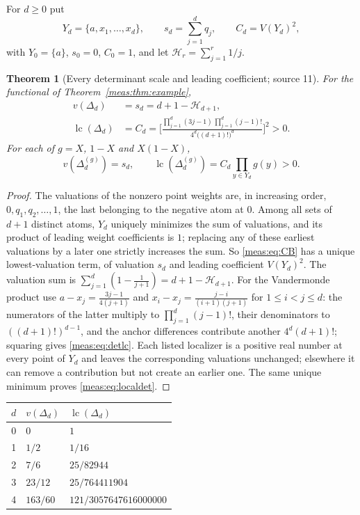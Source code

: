 \documentclass[11pt]{article}
\numberwithin{equation}{section}
\newtheorem{theorem}{Theorem}[section]
\theoremstyle{definition}
\theoremstyle{remark}
\newcommand{\lc}{\operatorname{lc}}
\begin{document}
For $d\ge0$ put
\[
 Y_d=\{a,x_1,\ldots,x_d\},\qquad s_d=\sum_{j=1}^dq_j,\qquad C_d=V(Y_d)^2,
\]
with $Y_0=\{a\}$, $s_0=0$, $C_0=1$, and let $\mathcal H_r=\sum_{j=1}^r1/j$.

\begin{theorem}[Every determinant scale and leading coefficient; source 11]
\label{meas:thm:determinants}
For the functional of Theorem~\ref{meas:thm:example},
\begin{align}
 v(\Delta_d)&=s_d=d+1-\mathcal H_{d+1},\label{meas:eq:detval}\\
 \lc(\Delta_d)&=C_d=\Biggl[
 \frac{\prod_{j=1}^{d}(3j-1)\,\prod_{j=1}^{d}(j-1)!}{4^d\bigl((d+1)!\bigr)^d}
 \Biggr]^2>0.\label{meas:eq:detlc}
\end{align}
For each of $g=X$, $1-X$ and $X(1-X)$,
\begin{equation}\label{meas:eq:localdet}
 v(\Delta_d^{(g)})=s_d,\qquad \lc(\Delta_d^{(g)})=C_d\prod_{y\in Y_d}g(y)>0.
\end{equation}
\end{theorem}
\begin{proof}
The valuations of the nonzero point weights are, in increasing order,
$0,q_1,q_2,\ldots,1$, the last belonging to the negative atom at $0$. Among all
sets of $d+1$ distinct atoms, $Y_d$ uniquely minimizes the sum of valuations,
and its product of leading weight coefficients is $1$; replacing any of these
earliest valuations by a later one strictly increases the sum. So
\eqref{meas:eq:CB} has a unique lowest-valuation term, of valuation $s_d$ and
leading coefficient $V(Y_d)^2$. The valuation sum is
$\sum_{j=1}^d(1-\frac1{j+1})=d+1-\mathcal H_{d+1}$. For the Vandermonde product
use $a-x_j=\frac{3j-1}{4(j+1)}$ and $x_i-x_j=\frac{j-i}{(i+1)(j+1)}$ for
$1\le i<j\le d$: the numerators of the latter multiply to
$\prod_{j=1}^d(j-1)!$, their denominators to $((d+1)!)^{d-1}$, and the anchor
differences contribute another $4^d(d+1)!$; squaring gives
\eqref{meas:eq:detlc}. Each listed localizer is a positive real number at every
point of $Y_d$ and leaves the corresponding valuations unchanged; elsewhere it
can remove a contribution but not create an earlier one. The same unique
minimum proves \eqref{meas:eq:localdet}.
\end{proof}

\begin{center}
\small
\begin{tabular}{@{}rll@{}}
\toprule
$d$ & $v(\Delta_d)$ & $\lc(\Delta_d)$\\
\midrule
0 & $0$ & $1$\\
1 & $1/2$ & $1/16$\\
2 & $7/6$ & $25/82944$\\
3 & $23/12$ & $25/764411904$\\
4 & $163/60$ & $121/3057647616000000$\\
\bottomrule
\end{tabular}
\end{center}
\end{document}
